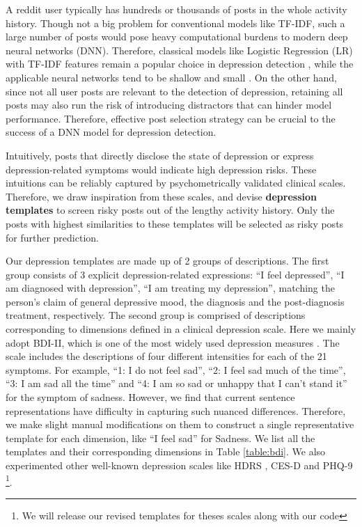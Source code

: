 A reddit user typically has hundreds or thousands of posts in the whole activity history. Though not a big problem for conventional models like TF-IDF, such a large number of posts would pose heavy computational burdens to modern deep neural networks (DNN). Therefore, classical models like Logistic Regression (LR) with TF-IDF features remain a popular choice in depression detection \citep{zhou2021detecting}, while the applicable neural networks tend to be shallow and small \citep{yates2017depression}. On the other hand, since not all user posts are relevant to the detection of depression, retaining all posts may also run the risk of introducing distractors that can hinder model performance. Therefore, effective post selection strategy can be crucial to the success of a DNN model for depression detection. 

Intuitively, posts that directly disclose the state of depression or express depression-related symptoms would indicate high depression risks. These intuitions can be reliably captured by psychometrically validated clinical scales. Therefore, we draw inspiration from these scales, and devise \textbf{depression templates} to screen risky posts out of the lengthy activity history. Only the posts with highest similarities to these templates will be selected as risky posts for further prediction.

Our depression templates are made up of 2 groups of descriptions. 
The first group consists of 3 explicit depression-related expressions: 
``I feel depressed'', ``I am diagnosed with depression'', 
``I am treating my depression'', matching the person's claim of 
general depressive mood, the diagnosis and the post-diagnosis treatment,
respectively. The second group is comprised of descriptions corresponding 
to dimensions defined in a clinical depression scale. 
Here we mainly adopt BDI-II, which is one of the most widely used depression 
measures \citep{beck1996beck}. 
The scale includes the descriptions of four different intensities for each of the 21 symptoms. For example, ``1: I do not feel sad'', ``2: I feel sad much of the time'', ``3: I am sad all the time'' and ``4: I am so sad or unhappy that I can't stand it'' for the symptom of sadness. However, we find that current sentence representations have difficulty in capturing such nuanced differences. Therefore, we make slight manual modifications on them to construct a single representative template for each dimension, like ``I feel sad'' for Sadness. We list all the templates and their corresponding dimensions in Table \ref{table:bdi}. We also experimented other well-known depression scales like HDRS \citep{hamilton1986hamilton}, CES-D \citep{Lenore1977CES-D} and PHQ-9 \citep{kroenke2001phq} \footnote{We will release our revised templates for theses scales along with our code}. 

